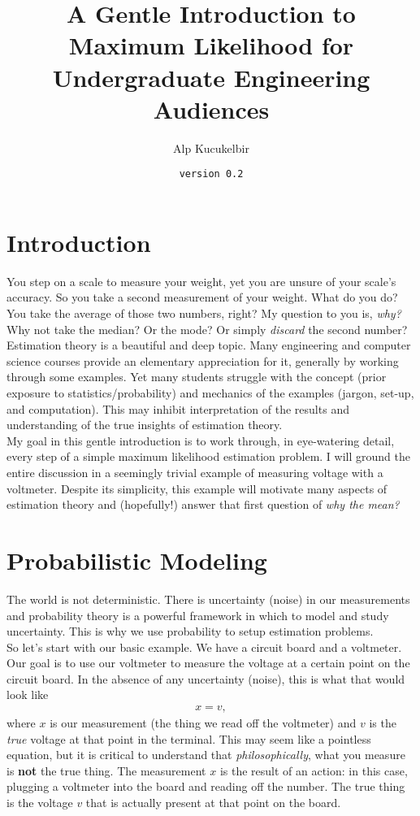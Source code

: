 \documentclass[10pt,letterpaper]{article}
\title{\textbf{A Gentle Introduction to Maximum Likelihood \break for Undergraduate Engineering Audiences}}
\author{Alp Kucukelbir}
\date{\texttt{version 0.2}}
\begin{document}
\maketitle

\section{Introduction}
You step on a scale to measure your weight, yet you are unsure of your scale's accuracy. So you take a second measurement of your weight. What do you do? You take the average of those two numbers, right? My question to you is, \emph{why?} Why not take the median? Or the mode? Or simply \emph{discard} the second number? \\

Estimation theory is a beautiful and deep topic. Many  engineering and computer science courses provide an elementary appreciation for it, generally by working through some examples. Yet many students struggle with the concept (prior exposure to statistics/probability) and mechanics of the examples (jargon, set-up, and computation). This may inhibit interpretation of the results and understanding of the true insights of estimation theory.\\

My goal in this gentle introduction is to work through, in eye-watering detail, every step of a simple maximum likelihood estimation problem. I will ground the entire discussion in a seemingly trivial example of measuring voltage with a voltmeter. Despite its simplicity, this example will motivate many aspects of estimation theory and (hopefully!) answer that first question of \emph{why the mean?}

\section{Probabilistic Modeling}
The world is not deterministic. There is uncertainty (noise) in our measurements and probability theory is a powerful framework in which to model and study uncertainty. This is why we use probability to setup estimation problems.\\

So let's start with our basic example. We have a circuit board and a voltmeter. Our goal is to use our voltmeter to measure the voltage at a certain point on the circuit board. In the absence of any uncertainty (noise), this is what that would look like
\begin{align}
	x = v,\label{relationshipModel}
\end{align}
where $x$ is our measurement (the thing we read off the voltmeter) and $v$ is the \emph{true} voltage at that point in the terminal. This may seem like a pointless equation, but it is critical to understand that \emph{philosophically}, what you measure is \textbf{not} the true thing. The measurement $x$ is the result of an action: in this case, plugging a voltmeter into the board and reading off the number. The true thing is the voltage $v$ that is actually present at that point on the board.\\
\end{document}
